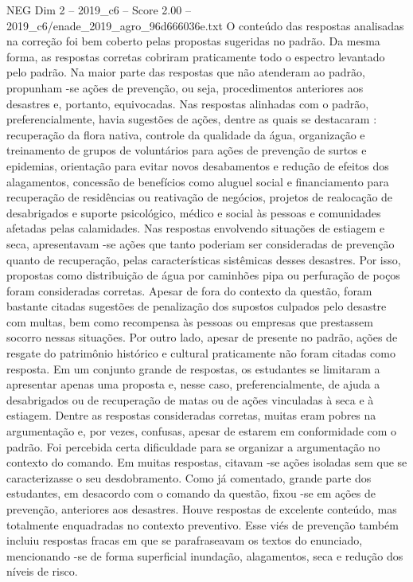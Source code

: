 \begin{textsample}{NEG Dim 2 – 2019\_c6 – Score 2.00 – 2019\_c6/enade\_2019\_agro\_96d666036e.txt}
O conteúdo das respostas analisadas na correção foi bem coberto pelas propostas sugeridas no padrão.
Da mesma forma, as respostas corretas cobriram praticamente todo o espectro levantado pelo padrão.
Na maior parte das respostas que não atenderam ao padrão, propunham -se ações de prevenção, ou seja, procedimentos anteriores aos desastres e, portanto, equivocadas.
Nas respostas alinhadas com o padrão, preferencialmente, havia sugestões de ações, dentre as quais se destacaram : recuperação da flora nativa, controle da qualidade da água, organização e treinamento de grupos de voluntários para ações de prevenção de surtos e epidemias, orientação para evitar novos desabamentos e redução de efeitos dos alagamentos, concessão de benefícios como aluguel social e financiamento para recuperação de residências ou reativação de negócios, projetos de realocação de desabrigados e suporte psicológico, médico e social às pessoas e comunidades afetadas pelas calamidades.
Nas respostas envolvendo situações de estiagem e seca, apresentavam -se ações que tanto poderiam ser consideradas de prevenção quanto de recuperação, pelas características sistêmicas desses desastres.
Por isso, propostas como distribuição de água por caminhões pipa ou perfuração de poços foram consideradas corretas.
Apesar de fora do contexto da questão, foram bastante citadas sugestões de penalização dos supostos culpados pelo desastre com multas, bem como recompensa às pessoas ou empresas que prestassem socorro nessas situações.
Por outro lado, apesar de presente no padrão, ações de resgate do patrimônio histórico e cultural praticamente não foram citadas como resposta.
Em um conjunto grande de respostas, os estudantes se limitaram a apresentar apenas uma proposta e, nesse caso, preferencialmente, de ajuda a desabrigados ou de recuperação de matas ou de ações vinculadas à seca e à estiagem.
Dentre as respostas consideradas corretas, muitas eram pobres na argumentação e, por vezes, confusas, apesar de estarem em conformidade com o padrão.
Foi percebida certa dificuldade para se organizar a argumentação no contexto do comando.
Em muitas respostas, citavam -se ações isoladas sem que se caracterizasse o seu desdobramento.
Como já comentado, grande parte dos estudantes, em desacordo com o comando da questão, fixou -se em ações de prevenção, anteriores aos desastres.
Houve respostas de excelente conteúdo, mas totalmente enquadradas no contexto preventivo.
Esse viés de prevenção também incluiu respostas fracas em que se parafraseavam os textos do enunciado, mencionando -se de forma superficial inundação, alagamentos, seca e redução dos níveis de risco.

\end{textsample}
